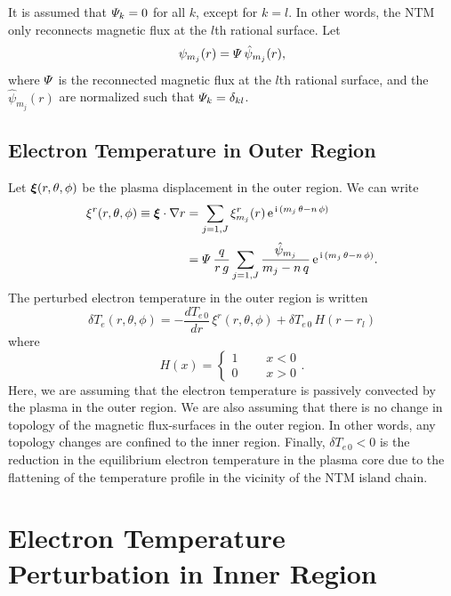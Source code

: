 \documentclass[12pt,prb,aps]{revtex4-1}
\newcommand {\bxi}{\mbox{\boldmath$\xi$}}
\begin{document}
 It is assumed that ${\mit\Psi}_k = 0$ for all $k$, except for $k=l$. In other words, the NTM only reconnects magnetic flux at the
$l$th rational surface. Let 
\begin{equation}
\psi_{m_j}(r) = {\mit\Psi}\,\hat{\psi}_{m_j}(r),
\end{equation}
where ${\mit\Psi}$ is the reconnected magnetic flux at the $l$th rational surface, and the $\hat{\psi}_{m_j}(r)$ are normalized such that ${\mit\Psi}_k
= \delta_{kl}$. 

\subsection{Electron Temperature in Outer Region}
Let $\bxi(r,\theta,\phi)$ be the plasma displacement in the outer region. We can write\,\cite{tear10}
\begin{align}\label{xi}
\xi^r(r,\theta,\phi)\equiv \bxi\cdot\nabla r& = \sum_{j=1,J}\xi_{m_j}^r(r)\,{\rm e}^{\,{\rm i}\,(m_j\,\theta-n\,\phi)}\nonumber\\[0.5ex]
&=
{\mit\Psi}\,\frac{q}{r\,g}\sum_{j=1,J}\frac{\hat{\psi}_{m_j}}{m_j-n\,q}\, {\rm e}^{\,{\rm i}\,(m_j\,\theta-n\,\phi)}.
\end{align}
The perturbed electron temperature  in the outer region is written
\begin{equation}
\delta T_e(r,\theta,\phi)= -\frac{dT_{e\,0}}{dr}\, \xi^r(r,\theta,\phi) + \delta T_{e\,0}\,H(r-r_{l})
\end{equation}
where
\begin{equation}
H(x)= \left\{\begin{array}{ccc}1&~~~&x<0\\0&&x>0\end{array}\right..
\end{equation}
Here, we are assuming that the electron temperature is passively convected by the plasma in the outer region. We are also
assuming that there is no change in topology of the magnetic flux-surfaces in the outer region. In other words, any topology changes are
confined to  the inner region. Finally, $\delta T_{e\,0}<0$ is the reduction in the equilibrium electron temperature in the plasma
core due to the flattening of the temperature profile in the vicinity of the NTM island chain.\cite{chang}

\section{Electron Temperature Perturbation in Inner Region}\label{s4}
\end{document}
